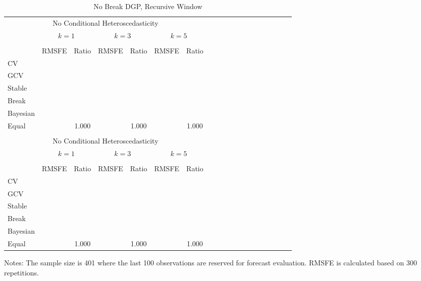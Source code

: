 \begin{sidewaystable}
\caption{No Break DGP, Recursive Window}
\centering
\begin{adjustbox}{width=\textwidth,totalheight=\textheight,keepaspectratio}
\begin{threeparttable}
\begin{tabular}{lcccccccccccccccccc}
\toprule
\multicolumn{7}{c}{No Conditional Heteroscedasticity}\\[0.3em]
 & \multicolumn{2}{c}{$k = 1$} & \multicolumn{2}{c}{$k = 3$} & \multicolumn{2}{c}{$k = 5$} \\
\cmidrule(r){2-3}
\cmidrule(r){4-5}
\cmidrule(r){6-7} \\
         &RMSFE &Ratio &RMSFE &Ratio &RMSFE &Ratio \\
CV       & & & & & & \\
GCV      & & & & & & \\
Stable   & & & & & & \\
Break    & & & & & & \\
Bayesian & & & & & & \\
Equal    & &1.000 & &1.000 & &1.000 \\
\\[0.3em]
\multicolumn{7}{c}{No Conditional Heteroscedasticity}\\[0.3em]
 & \multicolumn{2}{c}{$k = 1$} & \multicolumn{2}{c}{$k = 3$} & \multicolumn{2}{c}{$k = 5$} \\
\cmidrule(r){2-3}
\cmidrule(r){4-5}
\cmidrule(r){6-7} \\
         &RMSFE &Ratio &RMSFE &Ratio &RMSFE &Ratio \\
CV       & & & & & & \\
GCV      & & & & & & \\
Stable   & & & & & & \\
Break    & & & & & & \\
Bayesian & & & & & & \\
Equal    & &1.000 & &1.000 & &1.000 \\
\bottomrule
\end{tabular}
\begin{tablenotes} \footnotesize
Notes: The sample size is 401 where the last 100 observations are reserved for forecast evaluation. RMSFE is calculated based on 300 repetitions.
\end{tablenotes}
\end{threeparttable}
\end{adjustbox}
\end{sidewaystable}

